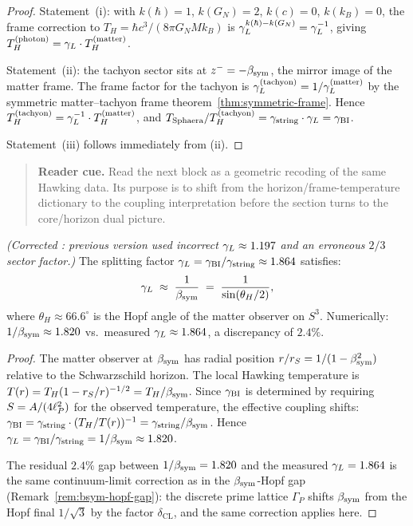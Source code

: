 \begin{proof}
Statement~(i): with $k(\hbar)=1$, $k(G_N)=2$, $k(c)=0$, $k(k_B)=0$,
the frame correction to $T_H = \hbar c^3/(8\pi G_N M k_B)$ is
$\gamma_L^{k(\hbar)-k(G_N)} = \gamma_L^{-1}$, giving
$T_H^{(\mathrm{photon})} = \gamma_L\cdot T_H^{(\mathrm{matter})}$.

Statement~(ii): the tachyon sector sits at $z^- = -\beta_{\mathrm{sym}}$, the mirror
image of the matter frame. The frame factor for the tachyon is
$\gamma_L^{(\mathrm{tachyon})} = 1/\gamma_L^{(\mathrm{matter})}$ by the symmetric
matter--tachyon frame theorem~\ref{thm:symmetric-frame}. Hence
$T_H^{(\mathrm{tachyon})} = \gamma_L^{-1}\cdot T_H^{(\mathrm{matter})}$, and
$T_{\mathrm{Sphaera}}/T_H^{(\mathrm{tachyon})}
= \gamma_{\mathrm{string}}\cdot\gamma_L = \gamma_{\mathrm{BI}}$.

Statement~(iii) follows immediately from (ii).
\end{proof}


\begin{quote}\small
\noindent\textbf{Reader cue.} Read the next block as a geometric recoding of the same Hawking data. Its purpose is to shift from the horizon/frame-temperature dictionary to the coupling interpretation before the section turns to the core/horizon dual picture.
\end{quote}

\begin{theorem}
\label{thm:dual-origin}
\emph{(Corrected : previous version used incorrect $\gamma_L\approx 1.197$
and an erroneous $2/3$ sector factor.)}
The splitting factor $\gamma_L=\gamma_{\mathrm{BI}}/\gamma_{\mathrm{string}}\approx 1.864$ satisfies:
\[
 \gamma_L \;\approx\; \frac{1}{\beta_{\mathrm{sym}}} \;=\; \frac{1}{\sin(\theta_H/2)},
\]
where $\theta_H\approx 66.6^\circ$ is the Hopf angle of the matter observer
on $S^3$. Numerically: $1/\beta_{\mathrm{sym}} \approx 1.820$ vs.\ measured
$\gamma_L\approx 1.864$, a discrepancy of $2.4\%$.
\end{theorem}

\begin{proof}
The matter observer at $\beta_{\mathrm{sym}}$ has radial position $r/r_S=1/(1-\beta_{\mathrm{sym}}^2)$
relative to the Schwarzschild horizon.
The local Hawking temperature is $T(r)=T_H(1-r_S/r)^{-1/2}=T_H/\beta_{\mathrm{sym}}$.
Since $\gamma_{\mathrm{BI}}$ is determined by requiring $S=A/(4\ell_P^2)$ for the observed
temperature, the effective coupling shifts:
$\gamma_{\mathrm{BI}} = \gamma_{\mathrm{string}}\cdot(T_H/T(r))^{-1} = \gamma_{\mathrm{string}}/\beta_{\mathrm{sym}}$.
Hence $\gamma_L = \gamma_{\mathrm{BI}}/\gamma_{\mathrm{string}} = 1/\beta_{\mathrm{sym}} \approx 1.820$.

The residual $2.4\%$ gap between $1/\beta_{\mathrm{sym}}=1.820$ and the measured
$\gamma_L=1.864$ is the same continuum-limit correction as in the $\beta_{\mathrm{sym}}$-Hopf
gap (Remark~\ref{rem:bsym-hopf-gap}): the discrete prime lattice
$\Gamma_P$ shifts $\beta_{\mathrm{sym}}$ from the Hopf final $1/\sqrt{3}$ by
the factor $\delta_{\mathrm{CL}}$, and the same correction applies here.
\end{proof}

